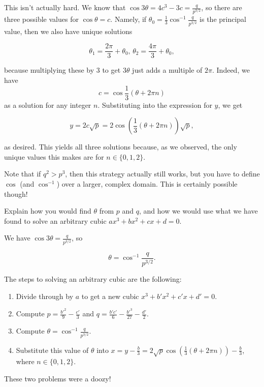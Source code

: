 \documentclass[../key.tex]{subfiles}
\begin{document}
This isn't actually hard. We know that $\cos 3\theta = 4c^3-3c = \frac{q}{p^{3/2}}$, so there are three possible values for $\cos\theta = c$. Namely, if $\theta_0 = \frac{1}{3}\cos^{-1} \frac{q}{p^{3/2}}$ is the principal value, then we also have unique solutions

$$\theta_1 = \frac{2\pi}{3} + \theta_0, \, \theta_2 = \frac{4\pi}{3} + \theta_0,$$

because multiplying these by $3$ to get $3\theta$ just adds a multiple of $2\pi$. Indeed, we have $$c = \cos\frac{1}{3}\left(\theta + 2\pi n\right)$$ as a solution for any integer $n$. Substituting into the expression for $y$, we get

$$y=2c\sqrt{p}=2\cos\left(\frac{1}{3}(\theta + 2\pi n)\right)\sqrt{p},$$

as desired. This yields all three solutions because, as we observed, the only unique values this makes are for $n\in \{0,1,2\}$.

Note that if $q^2 > p^3$, then this strategy actually still works, but you have to define $\cos$ (and $\cos^{-1}$) over a larger, complex domain. This is certainly possible though!

\begin{inner_problem}
\item Explain how you would find $\theta$ from $p$ and $q$, and how we would use what we have found to solve an arbitrary cubic $ax^3+bx^2+cx+d=0$.
\end{inner_problem}

We have $\cos 3\theta = \frac{q}{p^{3/2}}$, so

$$\theta = \cos^{-1} \frac{q}{p^{3/2}}.$$

The steps to solving an arbitrary cubic are the following:

\begin{enumerate}
\item Divide through by $a$ to get a new cubic $x^3 + b'x^2 + c'x + d' = 0$.
\item Compute $p = \frac{b'^2}{9} - \frac{c'}{3}$ and $q=\frac{b'c'}{6} - \frac{b'^3}{27} - \frac{d'}{2}$.
\item Compute $\theta = \cos^{-1} \frac{q}{p^{3/2}}$.
\item Substitute this value of $\theta$ into $x=y-\frac{b}{3}=2\sqrt{p}\cos\left(\frac{1}{3}(\theta+2\pi n)\right)-\frac{b}{3}$, where $n\in \{0,1,2\}$.
\end{enumerate}

These two problems were a doozy!
\end{document}
